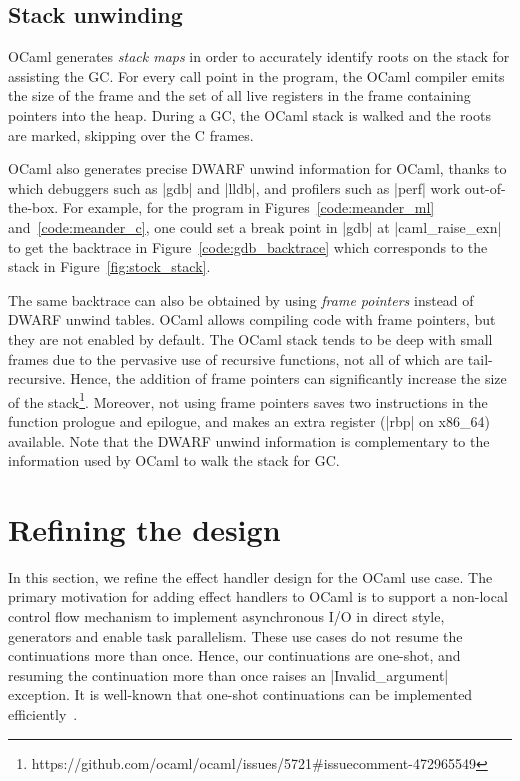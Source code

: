 \documentclass[sigplan,10pt,review,anonymous]{acmart}\settopmatter{printfolios=true,printccs=false,printacmref=false}
\begin{document}
\subsection{Stack unwinding}
\label{sec:unwind}

OCaml generates \emph{stack maps} in order to accurately identify roots on the
stack for assisting the GC. For every call point in the program, the OCaml
compiler emits the size of the frame and the set of all live registers in the
frame containing pointers into the heap. During a GC, the OCaml stack is walked
and the roots are marked, skipping over the C frames.

OCaml also generates precise DWARF unwind information for OCaml, thanks to
which debuggers such as |gdb| and |lldb|, and profilers such as |perf| work
out-of-the-box. For example, for the program in Figures~\ref{code:meander_ml}
and~\ref{code:meander_c}, one could set a break point in |gdb| at
|caml_raise_exn| to get the backtrace in Figure~\ref{code:gdb_backtrace} which
corresponds to the stack in Figure~\ref{fig:stock_stack}.

The same backtrace can also be obtained by using \emph{frame pointers} instead
of DWARF unwind tables. OCaml allows compiling code with frame pointers, but
they are not enabled by default. The OCaml stack tends to be deep with small frames
due to the pervasive use of recursive functions, not all of which are
tail-recursive. Hence, the addition of frame pointers can significantly
increase the size of the
stack\footnote{https://github.com/ocaml/ocaml/issues/5721\#issuecomment-472965549}.
Moreover, not using frame pointers saves two instructions in the function
prologue and epilogue, and makes an extra register (|rbp| on x86\_64) available.
Note that the DWARF unwind information is complementary to the information used
by OCaml to walk the stack for GC.

\section{Refining the design}
\label{sec:refine}

In this section, we refine the effect handler design for the OCaml use case. The
primary motivation for adding effect handlers to OCaml is to support a non-local
control flow mechanism to implement asynchronous I/O in direct style, generators
and enable task parallelism. These use cases do not resume the continuations
more than once. Hence, our continuations are one-shot, and resuming the
continuation more than once raises an |Invalid_argument| exception. It is
well-known that one-shot continuations can be implemented
efficiently~\cite{Bruggeman96}.
\end{document}
